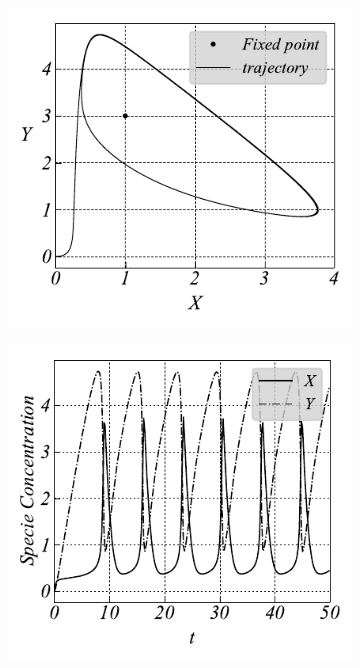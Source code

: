 \begin{figure}[H]
	\vspace{-0.5cm}
    \begin{subfigure}{.5\textwidth}
    \centering
    \includegraphics[width=1\linewidth, angle=0, clip]{03_Cap3/figures/Phase_Space_external__Brusselator__CN.pdf}
    \end{subfigure}
    \begin{subfigure}{.5\textwidth}
    \centering
    \includegraphics[width=1\linewidth, angle=0, clip]{03_Cap3/figures/Temporal_evolution_external__Brusselator__CN.pdf}
    \end{subfigure}
    \vspace{-0.5cm}
\end{figure}



